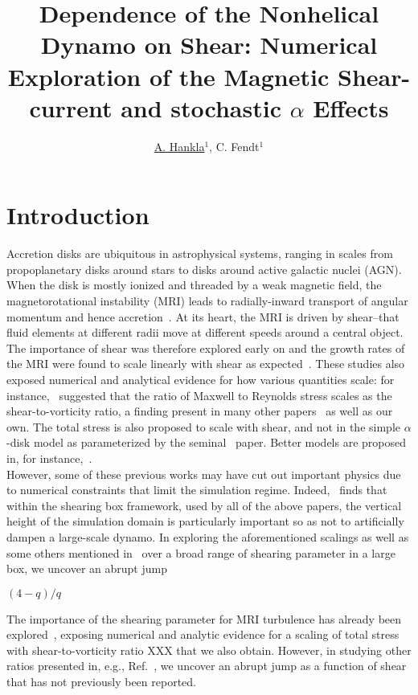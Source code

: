 \documentclass{epsconf}
\title{Dependence of the Nonhelical Dynamo on Shear: Numerical Exploration of the Magnetic Shear-current and stochastic $\alpha$ Effects}
\author{\underline{A. Hankla}$^1$, C. Fendt$^1$}
\institute{$^1$ Max Planck Institute for Astronomy, Heidelberg, Germany}
\begin{document}
\maketitle

\section{Introduction}
Accretion disks are ubiquitous in astrophysical systems, ranging in scales from propoplanetary disks around stars to disks around active galactic nuclei (AGN). When the disk is mostly ionized and threaded by a weak magnetic field, the magnetorotational instability (MRI) leads to radially-inward transport of angular momentum and hence accretion~\cite{BH98}. At its heart, the MRI is driven by shear--that fluid elements at different radii move at different speeds around a central object. The importance of shear was therefore explored early on and the growth rates of the MRI were found to scale linearly with shear as expected~\cite{XX}. These studies also exposed numerical and analytical evidence for how various quantities scale: for instance,~\citet{ABL95} suggested that the ratio of Maxwell to Reynolds stress scales as the shear-to-vorticity ratio, a finding present in many other papers~\cite{XX check these HBW99, NB15, GP15} as well as our own. The total stress is also proposed to scale with shear, and not in the simple $\alpha$-disk model as parameterized by the seminal~\cite{SS73} paper. Better models are proposed in, for instance,~\cite{PCP08}.\\
%
However, some of these previous works may have cut out important physics due to numerical constraints that limit the simulation regime. Indeed,~\citet{SSH16} finds that within the shearing box framework, used by all of the above papers, the vertical height of the simulation domain is particularly important so as not to artificially dampen a large-scale dynamo. In exploring the aforementioned scalings as well as some others mentioned in~\cite{SSH16} over a broad range of shearing parameter in a large box, we uncover an abrupt jump 


$(4-q)/q$



The importance of the shearing parameter for MRI turbulence has already been explored~\cite{ABL95, HBW99, NB15, GP15}, exposing numerical and analytic evidence for a scaling of total stress with shear-to-vorticity ratio XXX that we also obtain. However, in studying other ratios presented in, e.g., Ref.~\cite{XXX}, we uncover an abrupt jump as a function of shear that has not previously been reported. 
\end{document}
